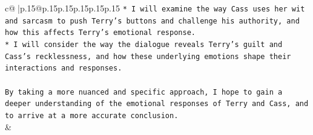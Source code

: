 \documentclass{article}
\begin{document}
{\begin{supertabular}{c@{$\;$}|p{.15\linewidth}@{}p{.15\linewidth}p{.15\linewidth}p{.15\linewidth}p{.15\linewidth}p{.15\linewidth}}
{{{\texttt{* I will examine the way Cass uses her wit and sarcasm to push Terry's buttons and challenge his authority, and how this affects Terry's emotional response.} \\
\texttt{* I will consider the way the dialogue reveals Terry's guilt and Cass's recklessness, and how these underlying emotions shape their interactions and responses.} \\
\\ 
\texttt{By taking a more nuanced and specific approach, I hope to gain a deeper understanding of the emotional responses of Terry and Cass, and to arrive at a more accurate conclusion.} \\
            }
        }
    }
    & \\ \\

\end{supertabular}
}
\end{document}

